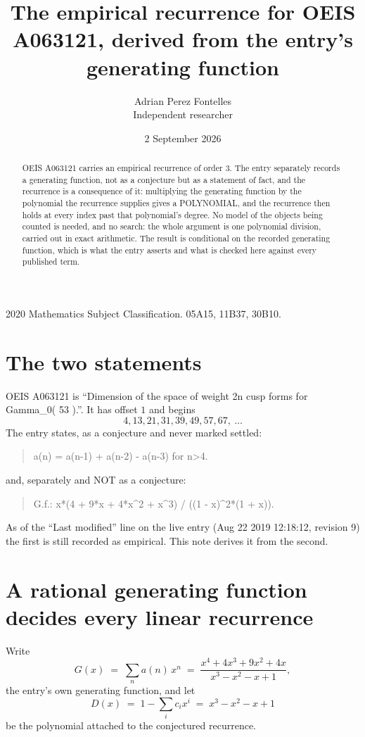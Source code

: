 \documentclass[11pt,a4paper]{article}
\title{The empirical recurrence for OEIS A063121, derived from the entry's generating function}
\author{Adrian Perez Fontelles\\ \small Independent researcher}
\date{2 September 2026}
\theoremstyle{plain}
\theoremstyle{definition}
\begin{document}
\maketitle

\begin{abstract}
OEIS A063121 carries an empirical recurrence of order $3$. The entry separately records a
generating function, not as a conjecture but as a statement of fact, and the recurrence is a
consequence of it: multiplying the generating function by the polynomial the recurrence
supplies gives a POLYNOMIAL, and the recurrence then holds at every index past that
polynomial's degree. No model of the objects being counted is needed, and no search: the
whole argument is one polynomial division, carried out in exact arithmetic. The result is
conditional on the recorded generating function, which is what the entry asserts and what is
checked here against every published term.
\end{abstract}

\noindent\small 2020 Mathematics Subject Classification. 05A15, 11B37, 30B10.\normalsize

\section{The two statements}

OEIS A063121 is ``Dimension of the space of weight 2n cusp forms for Gamma\_0( 53 ).''. It has offset $1$ and begins
\[
4, 13, 21, 31, 39, 49, 57, 67,\ \dots
\]
The entry states, as a conjecture and never marked settled:
\begin{quote}
a(n) = a(n-1) + a(n-2) - a(n-3) for n>4.
\end{quote}
and, separately and NOT as a conjecture:
\begin{quote}
G.f.: x*(4 + 9*x + 4*x\^{}2 + x\^{}3) / ((1 - x)\^{}2*(1 + x)).
\end{quote}
As of the ``Last modified'' line on the live entry (Aug 22 2019 12:18:12, revision 9) the first is still
recorded as empirical. This note derives it from the second.

\section{A rational generating function decides every linear recurrence}

Write
\[
G(x)\;=\;\sum_{n}a(n)\,x^{n}\;=\;\frac{x^{4} + 4 x^{3} + 9 x^{2} + 4 x}{x^{3} - x^{2} - x + 1},
\]
the entry's own generating function, and let
\[
D(x)\;=\;1-\sum_i c_i x^{i}\;=\;x^{3} - x^{2} - x + 1
\]
be the polynomial attached to the conjectured recurrence.
\end{document}
